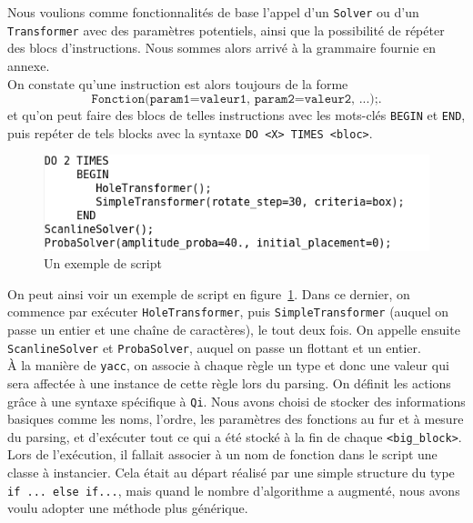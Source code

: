 Nous voulions comme fonctionnalités de base l'appel d'un \texttt{Solver} ou d'un \texttt{Transformer} avec des paramètres potentiels, ainsi que la possibilité de répéter des blocs d'instructions. Nous sommes alors arrivé à la grammaire fournie en annexe.\\

On constate qu'une instruction est alors toujours de la forme
$$\texttt{Fonction(param1=valeur1, param2=valeur2, ...);}.$$
et qu'on peut faire des blocs de telles instructions avec les mots-clés \texttt{BEGIN} et \texttt{END}, puis repéter de tels blocks avec la syntaxe \texttt{DO <X> TIMES <bloc>}.\\

\begin{figure}[H]
\centering
\includegraphics[scale=0.6]{img/closeEnough.png}
\caption{Un exemple de script}
\label{fig:closeEnough}
\end{figure}

On peut ainsi voir un exemple de script en figure~\ref{fig:closeEnough}. Dans ce dernier, on commence par exécuter \texttt{HoleTransformer}, puis \texttt{SimpleTransformer} (auquel on passe un entier et une chaîne de caractères), le tout deux fois. On appelle ensuite \texttt{ScanlineSolver} et \texttt{ProbaSolver}, auquel on passe un flottant et un entier.\\

À la manière de \texttt{yacc}, on associe à chaque règle un type et donc une valeur qui sera affectée à une instance de cette règle lors du parsing. On définit les actions grâce à une syntaxe spécifique à \texttt{Qi}. Nous avons choisi de stocker des informations basiques comme les noms, l'ordre, les paramètres des fonctions au fur et à mesure du parsing, et d'exécuter tout ce qui a été stocké à la fin de chaque \texttt{<big\_block>}.\\

Lors de l'exécution, il fallait associer à un nom de fonction dans le script une classe à instancier. Cela était au départ réalisé par une simple structure du type \texttt{if ... else if...}, mais quand le nombre d'algorithme a augmenté, nous avons voulu adopter une méthode plus générique.\\

